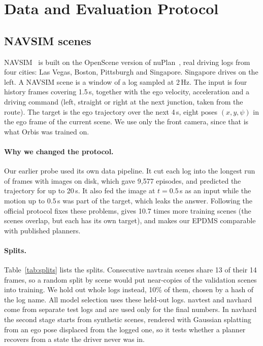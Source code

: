 \section{Data and Evaluation Protocol}
\label{sec:data}

\subsection{NAVSIM scenes}
\label{sec:navsim}

NAVSIM~\cite{navsim1} is built on the OpenScene version of nuPlan~\cite{nuplan},
real driving logs from four cities: Las Vegas, Boston, Pittsburgh and Singapore.
Singapore drives on the left. A NAVSIM scene is a window of a log sampled at
2\,Hz. The input is four history frames covering 1.5\,s, together with the ego
velocity, acceleration and a driving command (left, straight or right at the next
junction, taken from the route). The target is the ego trajectory over the next
4\,s, eight poses $(x,y,\psi)$ in the ego frame of the current scene. We use only
the front camera, since that is what Orbis was trained on.

\paragraph{Why we changed the protocol.}
Our earlier probe used its own data pipeline. It cut each log into the longest
run of frames with images on disk, which gave 9,577 episodes, and predicted the
trajectory for up to 20\,s. It also fed the image at $t=0.5$\,s as an input while
the motion up to $0.5$\,s was part of the target, which leaks the answer.
Following the official protocol fixes these problems, gives 10.7 times more
training scenes (the scenes overlap, but each has its own target), and makes our
EPDMS comparable with published planners.

\paragraph{Splits.}
Table~\ref{tab:splits} lists the splits. Consecutive navtrain scenes share 13 of
their 14 frames, so a random split by scene would put near-copies of the
validation scenes into training. We hold out whole logs instead, 10\% of them,
chosen by a hash of the log name. All model selection uses these held-out logs.
navtest and navhard come from separate test logs and are used only for the final
numbers. In navhard the second stage starts from synthetic scenes, rendered with
Gaussian splatting from an ego pose displaced from the logged one, so it tests
whether a planner recovers from a state the driver never was in.


